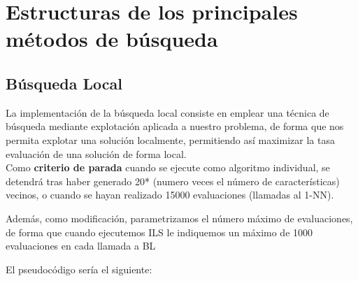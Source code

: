 \section{Estructuras de los principales métodos de búsqueda}

\subsection{Búsqueda Local}
La implementación de la búsqueda local consiste en emplear una técnica de búsqueda mediante explotación aplicada a nuestro problema, de forma que nos permita explotar una solución localmente, permitiendo así maximizar la tasa evaluación de una solución de forma local.\\ 

Como \textbf{criterio de parada} cuando se ejecute como algoritmo individual, se detendrá tras haber generado 20* (numero veces el número de características) vecinos, o cuando se hayan realizado 15000 evaluaciones (llamadas al 1-NN).

Además, como modificación, parametrizamos el número máximo de evaluaciones, de forma que cuando ejecutemos ILS le indiquemos un máximo de 1000 evaluaciones en cada llamada a BL

El pseudocódigo sería el siguiente:

